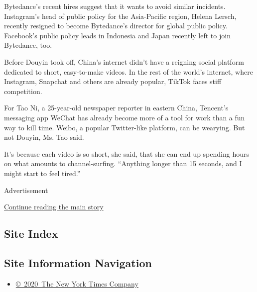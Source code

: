 Bytedance's recent hires suggest that it wants to avoid similar
incidents. Instagram's head of public policy for the Asia-Pacific
region, Helena Lersch, recently resigned to become Bytedance's director
for global public policy. Facebook's public policy leads in Indonesia
and Japan recently left to join Bytedance, too.

Before Douyin took off, China's internet didn't have a reigning social
platform dedicated to short, easy-to-make videos. In the rest of the
world's internet, where Instagram, Snapchat and others are already
popular, TikTok faces stiff competition.

For Tao Ni, a 25-year-old newspaper reporter in eastern China, Tencent's
messaging app WeChat has already become more of a tool for work than a
fun way to kill time. Weibo, a popular Twitter-like platform, can be
wearying. But not Douyin, Ms. Tao said.

It's because each video is so short, she said, that she can end up
spending hours on what amounts to channel-surfing. ``Anything longer
than 15 seconds, and I might start to feel tired.''

Advertisement

\protect\hyperlink{after-bottom}{Continue reading the main story}

\hypertarget{site-index}{%
\subsection{Site Index}\label{site-index}}

\hypertarget{site-information-navigation}{%
\subsection{Site Information
Navigation}\label{site-information-navigation}}

\begin{itemize}
\tightlist
\item
  \href{https://help.nytimes.com/hc/en-us/articles/115014792127-Copyright-notice}{©~2020~The
  New York Times Company}
\end{itemize}

